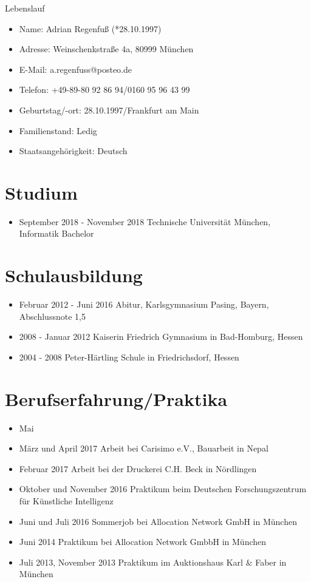 \documentclass[11pt,a4paper]{article}
\begin{document}
\thispagestyle{empty}
\pagestyle{empty}

{\bf\centerline{{\huge Lebenslauf}}}
\vspace{15pt}

\begin{itemize}
\item[] Name: Adrian Regenfuß (*28.10.1997)
\item[] Adresse: Weinschenkstraße 4a, 80999 München
\item[] E-Mail: a.regenfuss@posteo.de
\item[] Telefon: +49-89-80 92 86 94/0160 95 96 43 99
\item[] Geburtstag/-ort: 28.10.1997/Frankfurt am Main
\item[] Familienstand: Ledig
\item[] Staatsangehörigkeit: Deutsch
\end{itemize}

\section*{Studium}
\begin{itemize}
\setlength{\itemsep}{1pt}
\item[] September 2018 - November 2018 \hfill Technische Universität München, Informatik Bachelor
\end{itemize}

\section*{Schulausbildung}
\begin{itemize}
\setlength{\itemsep}{1pt}
\item[] Februar 2012 - Juni 2016 \hfill Abitur, Karlsgymnasium Pasing, Bayern, Abschlussnote 1,5
\item[] 2008 - Januar 2012 \hfill Kaiserin Friedrich Gymnasium in Bad-Homburg, Hessen
\item[] 2004 - 2008 \hfill Peter-Härtling Schule in Friedrichsdorf, Hessen
\end{itemize}

\section*{Berufserfahrung/Praktika}
\begin{itemize}
\setlength{\itemsep}{1pt}
\item[] Mai
\item[] März und April 2017 \hfill Arbeit bei Carisimo e.V., Bauarbeit in Nepal
\item[] Februar 2017 \hfill Arbeit bei der Druckerei C.H. Beck in Nördlingen
\item[] Oktober und November 2016 \hfill Praktikum beim Deutschen Forschungszentrum für Künstliche Intelligenz
\item[] Juni und Juli 2016 \hfill Sommerjob bei Allocation Network GmbH in München
\item[] Juni 2014 \hfill Praktikum bei Allocation Network GmbbH in München
\item[] Juli 2013, November 2013 \hfill Praktikum im Auktionshaus Karl \& Faber in München
\end{itemize}
\end{document}
